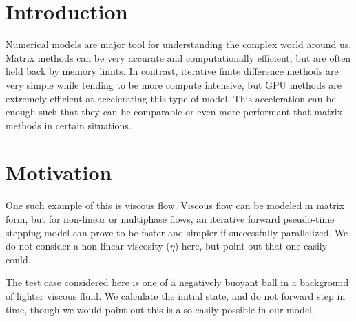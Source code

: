 

\myfont %
\section*{\myfont Introduction} %
Numerical models are major tool for understanding the complex world around us. Matrix methods can be very accurate and computationally efficient, but are often held back by memory limits. In contrast, iterative finite difference methods are very simple while tending to be more compute intensive, but GPU methods are extremely efficient at accelerating this type of model. This acceleration can be enough such that they can be comparable or even more performant that matrix methods in certain situations.
\section*{\myfont Motivation} %

One such example of this is viscous flow. Viscous flow can be modeled in matrix form, but for non-linear or multiphase flows, an iterative forward pseudo-time stepping model can prove to be faster and simpler if successfully parallelized. We do not consider a non-linear viscosity ($\eta$) here, but point out that one easily could.

The test case considered here is one of a negatively buoyant ball in a background of lighter viscous fluid. We calculate the initial state, and do not forward step in time, though we would point out this is also easily possible in our model. 
